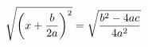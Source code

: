 \documentclass[preview]{standalone}
\begin{document}
\begin{align*}
{\sqrt { \left( x + { b \over 2 a } \right) ^2 } = \sqrt { b ^2 - 4 a c \over 4 a ^2 } }
\end{align*}
\end{document}
